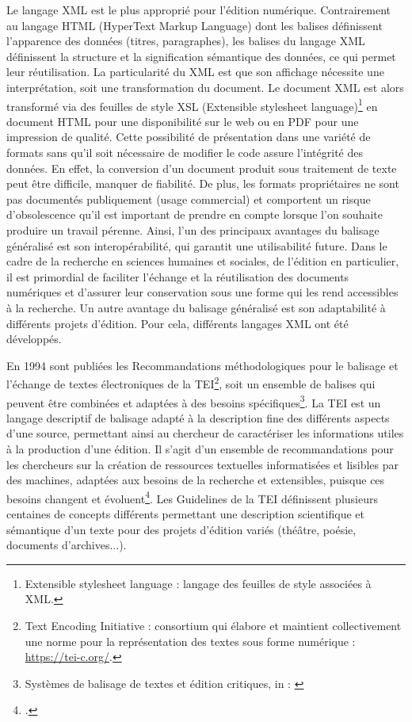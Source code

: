 \par Le langage XML est le plus approprié pour l’édition numérique. Contrairement au langage HTML (HyperText Markup Language) dont les balises définissent l’apparence des données (titres, paragraphes), les balises du langage XML définissent la structure et la signification sémantique des données, ce qui permet leur réutilisation. La particularité du XML est que son affichage nécessite une interprétation, soit une transformation du document. Le document XML est alors transformé via des feuilles de style XSL (Extensible stylesheet language)\footnote{Extensible stylesheet language : langage des feuilles de style associées à XML.} en document HTML pour une disponibilité sur le web ou en PDF pour une impression de qualité. Cette possibilité de présentation dans une variété de formats sans qu'il soit nécessaire de modifier le code assure l'intégrité des données. En effet, la conversion d'un document produit sous traitement de texte peut être difficile, manquer de fiabilité. De plus, les formats propriétaires ne sont pas documentés publiquement (usage commercial) et comportent un risque d’obsolescence qu’il est important de prendre en compte lorsque l’on souhaite produire un travail pérenne. Ainsi, l’un des principaux avantages du balisage généralisé est son interopérabilité, qui garantit une utilisabilité future. Dans le cadre de la recherche en sciences humaines et sociales, de l’édition en particulier, il est primordial de faciliter l'échange et la réutilisation des documents numériques et d’assurer leur conservation sous une forme qui les rend accessibles à la recherche. Un autre avantage du balisage généralisé est son adaptabilité à différents projets d'édition. Pour cela, différents langages XML ont été développés. 
\newline 

\par En 1994 sont publiées les Recommandations méthodologiques pour le balisage et l'échange de textes électroniques de la TEI\footnote{Text Encoding Initiative : consortium qui élabore et maintient collectivement une norme pour la représentation des textes sous forme numérique : \url{https://tei-c.org/}.}, soit un ensemble de balises qui peuvent être combinées et adaptées à des besoins spécifiques\footnote{\og Systèmes de balisage de textes et édition critiques\fg, in : \cite{apollonEditionCritiqueEre2017}}. La TEI est un langage descriptif de balisage adapté à la description fine des différents aspects d’une source, permettant ainsi au chercheur de caractériser les informations utiles à la production d'une édition. Il s'agit d'un ensemble de recommandations pour les chercheurs sur la création de ressources textuelles informatisées et lisibles par des machines, adaptées aux besoins de la recherche et extensibles, puisque ces besoins changent et évoluent\footnote{\cite{burnardQuEstceQue2015}.}. Les Guidelines de la TEI définissent plusieurs centaines de concepts différents permettant une description scientifique et sémantique d’un texte pour des projets d'édition variés (théâtre, poésie, documents d'archives...). 
\newpage 

